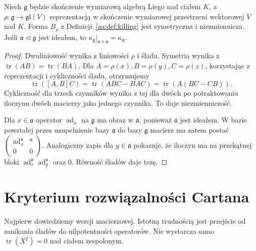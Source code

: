 \begin{stwierdzenie}
\label{aa:prop:killing-properties}
Niech $\mathfrak g$ będzie skończenie wymiarową
algebrą Liego nad ciałem $K$, a
$\rho:\mathfrak g\to\mathfrak{gl}(V)$ reprezentacją
w skończenie wymiarowej przestrzeni wektorowej $V$
nad $K$. Forma $B_\rho$ z Definicji~\ref{aa:def:killing}
jest symetryczna i niezmiennicza. Jeśli
$\mathfrak a\triangleleft\mathfrak g$ jest ideałem,
to $\kappa_{\mathfrak g}|_{\mathfrak a\times\mathfrak a}
=\kappa_{\mathfrak a}$.
\end{stwierdzenie}
\begin{proof}
Dwuliniowość wynika z liniowości $\rho$ i śladu.
Symetria wynika z $\operatorname{tr}(AB)=
\operatorname{tr}(BA)$. Dla $A=\rho(x),B=\rho(y),
C=\rho(z)$, korzystając z reprezentacji i cykliczności
śladu, otrzymujemy
\[
 \operatorname{tr}([A,B]C)=\operatorname{tr}(ABC-BAC)
 =\operatorname{tr}(A(BC-CB)).
\]
Cykliczność dla trzech czynników wynika z tej dla
dwóch po potraktowaniu iloczynu dwóch macierzy
jako jednego czynnika. To daje niezmienniczość.

Dla $x\in\mathfrak a$ operator $\operatorname{ad}_x$
na $\mathfrak g$ ma obraz w $\mathfrak a$, ponieważ
$\mathfrak a$ jest ideałem. W bazie powstałej przez
uzupełnienie bazy $\mathfrak a$ do bazy $\mathfrak g$
macierz ma zatem postać
$\begin{pmatrix}\operatorname{ad}^{\mathfrak a}_x&*\\0&0\end{pmatrix}$.
Analogiczny zapis dla $y\in\mathfrak a$ pokazuje,
że iloczyn ma na przekątnej bloki
$\operatorname{ad}^{\mathfrak a}_x
\operatorname{ad}^{\mathfrak a}_y$ oraz $0$.
Równość śladów daje tezę.
\end{proof}

\section{Kryterium rozwiązalności Cartana}

Najpierw dowiedziemy wersji macierzowej.
Istotną trudnością jest przejście od zanikania
śladów do nilpotentności operatorów. Nie wystarcza
samo $\operatorname{tr}(X^2)=0$ nad ciałem zespolonym.


